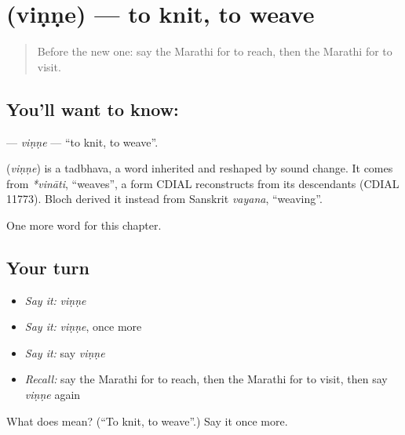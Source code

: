 \section[\texorpdfstring{\mr{विणणे} (viṇṇe)}{विणणे (viṇṇe)}]{ (viṇṇe) — to knit, to weave}

\label{lesson:MR-C199-vinne}



\begin{quote}
Before the new one: say the Marathi for to reach, then the Marathi for to visit.
\end{quote}

\subsection*{You'll want to know: }
\textbf{} — \emph{viṇṇe} — \textquotedblleft{}to knit, to weave\textquotedblright{}.

\begin{cousinweb}
\textbf{} (\emph{viṇṇe}) is a tadbhava, a word inherited and reshaped by sound change. It comes from \emph{*vināti}, \textquotedblleft{}weaves\textquotedblright{}, a form CDIAL reconstructs from its descendants (CDIAL 11773). Bloch derived it instead from Sanskrit \emph{vayana}, \textquotedblleft{}weaving\textquotedblright{}.
\end{cousinweb}

\begin{grammarlens}[title={What you've built}]
One more word for this chapter.
\end{grammarlens}

\subsection*{Your turn}
\begin{itemize}
\raggedright
  \item \emph{Say it:} \emph{viṇṇe}
  \item \emph{Say it:} \emph{viṇṇe}, once more
  \item \emph{Say it:} say \emph{viṇṇe}
  \item \emph{Recall:} say the Marathi for to reach, then the Marathi for to visit, then say \emph{viṇṇe} again
\end{itemize}

\begin{tcolorbox}[breakable,colback=teal!4,colframe=teal!35!black,title={Before you move on}]
What does  mean? (\textquotedblleft{}To knit, to weave\textquotedblright{}.) Say it once more.
\end{tcolorbox}
